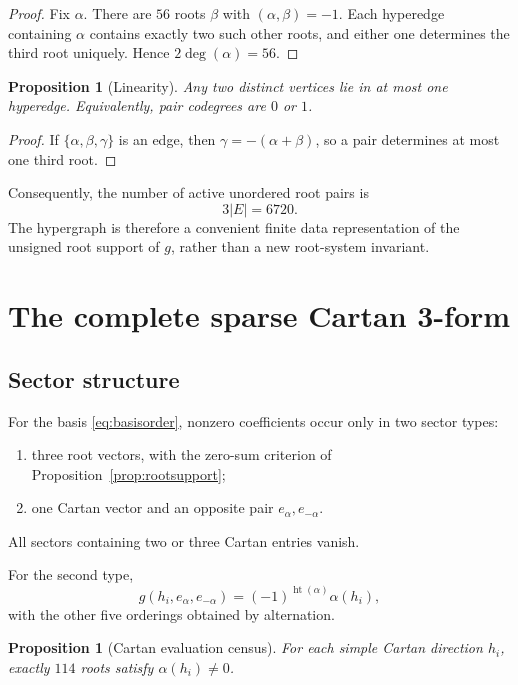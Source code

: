 \documentclass[11pt]{article}
\newtheorem{proposition}[theorem]{Proposition}
\theoremstyle{definition}
\theoremstyle{remark}
\begin{document}
\begin{proof}
Fix $\alpha$.  There are $56$ roots $\beta$ with $(\alpha,\beta)=-1$.  Each hyperedge containing $\alpha$ contains exactly two such other roots, and either one determines the third root uniquely.  Hence $2\deg(\alpha)=56$.
\end{proof}

\begin{proposition}[Linearity]\label{prop:linearity}
Any two distinct vertices lie in at most one hyperedge.  Equivalently, pair codegrees are $0$ or $1$.
\end{proposition}

\begin{proof}
If $\{\alpha,\beta,\gamma\}$ is an edge, then $\gamma=-(\alpha+\beta)$, so a pair determines at most one third root.
\end{proof}

Consequently, the number of active unordered root pairs is
\[
3|E|=6720.
\]
The hypergraph is therefore a convenient finite data representation of the unsigned root support of $g$, rather than a new root-system invariant.

\section{The complete sparse Cartan 3-form}\label{sec:sparse}

\subsection{Sector structure}

For the basis \eqref{eq:basisorder}, nonzero coefficients occur only in two sector types:
\begin{enumerate}[label=(\roman*)]
\item three root vectors, with the zero-sum criterion of Proposition~\ref{prop:rootsupport};
\item one Cartan vector and an opposite pair $e_\alpha,e_{-\alpha}$.
\end{enumerate}
All sectors containing two or three Cartan entries vanish.

For the second type,
\begin{equation}\label{eq:hrrformula}
g(h_i,e_\alpha,e_{-\alpha})
=(-1)^{\operatorname{ht}(\alpha)}\alpha(h_i),
\end{equation}
with the other five orderings obtained by alternation.

\begin{proposition}[Cartan evaluation census]\label{prop:114}
For each simple Cartan direction $h_i$, exactly $114$ roots satisfy $\alpha(h_i)\neq0$.
\end{proposition}
\end{document}
